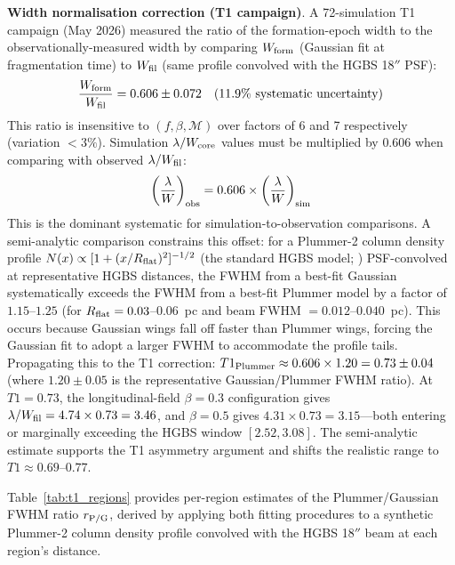 \documentclass[twoside,twocolumn]{mnras}
\begin{document}
\textbf{Width normalisation correction (T1 campaign)}.
\label{sec:width_correction}
A 72-simulation T1 campaign (May 2026) measured the ratio of the formation-epoch width
to the observationally-measured width by comparing $W_{\rm form}$ (Gaussian fit at
fragmentation time) to $W_{\rm fil}$ (same profile convolved with the HGBS 18$''$ PSF):
\begin{equation}
\frac{W_{\rm form}}{W_{\rm fil}} = 0.606 \pm 0.072 \quad (11.9\% \text{ systematic uncertainty})
\label{eq:t1_correction}
\end{equation}
This ratio is insensitive to $(f, \beta, \mathcal{M})$ over factors of 6 and 7
respectively (variation $<3\%$). Simulation $\lambda/W_{\rm core}$ values must be
multiplied by 0.606 when comparing with observed $\lambda/W_{\rm fil}$:
\begin{equation}
\left(\frac{\lambda}{W}\right)_{\rm obs} = 0.606 \times \left(\frac{\lambda}{W}\right)_{\rm sim}
\label{eq:t1_apply}
\end{equation}
This is the dominant systematic for simulation-to-observation comparisons. A semi-analytic comparison constrains this offset: for a Plummer-2 column density profile $N(x) \propto [1 + (x/R_{\rm flat})^2]^{-1/2}$ (the standard HGBS model; \citealt{Arzoumanian2011}) PSF-convolved at representative HGBS distances, the FWHM from a best-fit Gaussian systematically exceeds the FWHM from a best-fit Plummer model by a factor of $1.15$--$1.25$ (for $R_{\rm flat} = 0.03$--$0.06$~pc and beam FWHM $= 0.012$--$0.040$~pc). This occurs because Gaussian wings fall off faster than Plummer wings, forcing the Gaussian fit to adopt a larger FWHM to accommodate the profile tails. Propagating this to the T1 correction: $T1_{\rm Plummer} \approx 0.606 \times 1.20 = 0.73 \pm 0.04$ (where $1.20 \pm 0.05$ is the representative Gaussian/Plummer FWHM ratio). At $T1 = 0.73$, the longitudinal-field $\beta = 0.3$ configuration gives $\lambda/W_{\rm fil} = 4.74 \times 0.73 = 3.46$, and $\beta = 0.5$ gives $4.31 \times 0.73 = 3.15$---both entering or marginally exceeding the HGBS window $[2.52, 3.08]$. The semi-analytic estimate supports the T1 asymmetry argument and shifts the realistic range to $T1 \approx 0.69$--$0.77$.

Table~\ref{tab:t1_regions} provides per-region estimates of the Plummer/Gaussian FWHM ratio $r_{\rm P/G}$, derived by applying both fitting procedures to a synthetic Plummer-2 column density profile convolved with the HGBS 18$''$ beam at each region's distance.
\end{document}
